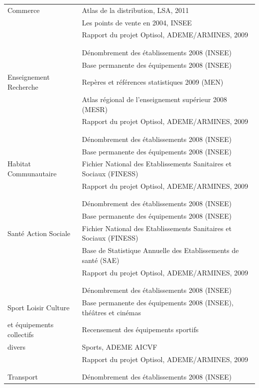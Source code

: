 \documentclass[10.5pt,a4paper]{article}
\begin{document}
{{{\begin{tabular}{l|l}
Commerce				& 	Atlas de la distribution, LSA, 2011 \\
						&	Les points de vente en 2004, INSEE \\
						&	Rapport du projet Optisol, ADEME/ARMINES, 2009 \\
\\	\hline	\\					
						&	Dénombrement des établissements 2008 (INSEE) \\
						&	Base permanente des équipements 2008 (INSEE) \\
Enseignement Recherche	& 	Repères et références statistiques 2009 (MEN) \\
						&	Atlas régional de l’enseignement supérieur 2008 (MESR) \\
						&	Rapport du projet Optisol, ADEME/ARMINES, 2009 \\
\\	\hline	\\
						&	Dénombrement des établissements 2008 (INSEE) \\
						&	Base permanente des équipements 2008 (INSEE) \\
Habitat Communautaire	& 	Fichier National des Etablissements Sanitaires et Sociaux (FINESS) \\
						&	Rapport du projet Optisol, ADEME/ARMINES, 2009 \\
\\	\hline	\\
						&	Dénombrement des établissements 2008 (INSEE) \\
						&	Base permanente des équipements 2008 (INSEE) \\
Santé Action Sociale	& 	Fichier National des Etablissements Sanitaires et Sociaux (FINESS) \\
						&	Base de Statistique Annuelle des Etablissements de santé (SAE) \\
						&	Rapport du projet Optisol, ADEME/ARMINES, 2009 \\
\\	\hline	\\
						&	Dénombrement des établissements 2008 (INSEE) \\
Sport Loisir Culture	&	Base permanente des équipements 2008 (INSEE), théâtres et cinémas \\
et équipements collectifs 	& 	Recensement des équipements sportifs \\
divers					&	Sports, ADEME AICVF \\
						&	Rapport du projet Optisol, ADEME/ARMINES, 2009 \\
\\	\hline	\\
Transport				&	Dénombrement des établissements 2008 (INSEE)
\end{tabular}
}
}

}
\end{document}
